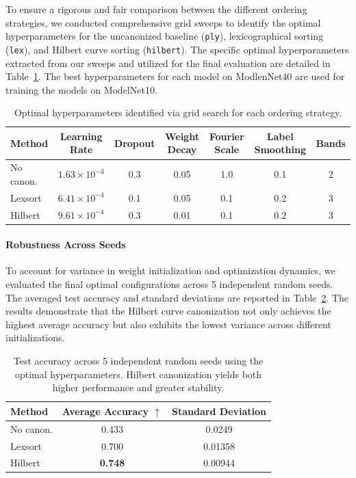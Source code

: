 \documentclass{article}
\theoremstyle{definition}
\theoremstyle{plain}
\begin{document}
To ensure a rigorous and fair comparison between the different ordering strategies, we conducted comprehensive grid sweeps to identify the optimal hyperparameters for the uncanonized baseline (\texttt{ply}), lexicographical sorting (\texttt{lex}), and Hilbert curve sorting (\texttt{hilbert}). The specific optimal hyperparameters extracted from our sweeps and utilized for the final evaluation are detailed in Table~\ref{tab:hyperparams}.
The best hyperparameters for each model on ModlenNet40 are used for training the models on ModelNet10. 
\begin{table}[h]
\centering
\caption{Optimal hyperparameters identified via grid search for each ordering strategy.}
\label{tab:hyperparams}
\begin{tabular}{lcccccc}
\toprule
\textbf{Method} & \textbf{Learning Rate} & \textbf{Dropout} & \textbf{Weight Decay} & \textbf{Fourier Scale} & \textbf{Label Smoothing} & \textbf{Bands} \\
\midrule
No canon. & $1.63 \times 10^{-3}$ & 0.3 & 0.05 & 1.0 & 0.1 & 2 \\
Lexsort  & $6.41 \times 10^{-4}$ & 0.1 & 0.05 & 0.1 & 0.2 & 3 \\
Hilbert  & $9.61 \times 10^{-4}$ & 0.3 & 0.01 & 0.1 & 0.2 & 3 \\
\bottomrule
\end{tabular}
\end{table}

\paragraph{Robustness Across Seeds}
To account for variance in weight initialization and optimization dynamics, we evaluated the final optimal configurations across 5 independent random seeds. The averaged test accuracy and standard deviations are reported in Table~\ref{tab:seed_robustness}. The results demonstrate that the Hilbert curve canonization not only achieves the highest average accuracy but also exhibits the lowest variance across different initializations.

\begin{table}[h]
\centering
\caption{Test accuracy across 5 independent random seeds using the optimal hyperparameters. Hilbert canonization yields both higher performance and greater stability.}
\label{tab:seed_robustness}
\begin{tabular}{lcc}
\toprule
\textbf{Method} & \textbf{Average Accuracy} $\uparrow$ & \textbf{Standard Deviation} \\
\midrule
No canon. & 0.433 & 0.0249 \\
Lexsort  & 0.700 & 0.01358 \\
Hilbert  & \textbf{0.748} & 0.00944 \\
\bottomrule
\end{tabular}
\end{table}
\end{document}

